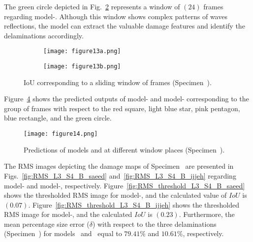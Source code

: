 The green circle depicted in Fig.~\ref{fig:L3_S4_B_333x333p_50kHz_5HC_shapes_} represents a window of \((24)\) frames regarding model-.
Although this window shows complex patterns of waves reflections, the model can extract the valuable damage features and identify the delaminations accordingly.
\begin{figure} [!h]
	\centering
	\begin{subfigure}[b]{1\textwidth}
		\centering
		\texttt{[image: figure13a.png]}
		\caption{}
		\label{fig:L3_S4_B_333x333p_50kHz_5HC_IoU}
	\end{subfigure}
	\par\medskip
	\begin{subfigure}[b]{1\textwidth}
		\centering
		\texttt{[image: figure13b.png]}
		\caption{} 
		\label{fig:L3_S4_B_333x333p_50kHz_5HC_shapes_}
	\end{subfigure}
	\caption{IoU corresponding to a sliding window of frames (Specimen~).}
	\label{fig:L3_S4_B_333x333p_50kHz_5HC_IoU_centre_window}
\end{figure} 

Figure~\ref{fig:L3_S4_B_5HC_predictions} shows the predicted outputs of model- and model- corresponding to the group of frames with respect to the red square, light blue star, pink pentagon, blue rectangle, and the green circle. 
\begin{figure}[!h]
	\centering
	\texttt{[image: figure14.png]}
	\caption{Predictions of models  and  at different window places (Specimen~).}
	\label{fig:L3_S4_B_5HC_predictions}
\end{figure}

The RMS images depicting the damage maps of Specimen~ are presented in Figs.~\ref{fig:RMS_L3_S4_B_saeed} and~\ref{fig:RMS_L3_S4_B_ijjeh} regarding model- and model-, respectively.
Figure~\ref{fig:RMS_threshold_L3_S4_B_saeed} shows the thresholded RMS image for model-, and the calculated value of \(IoU\) is \((0.07)\).
Figure~\ref{fig:RMS_threshold_L3_S4_B_ijjeh}  shows the thresholded RMS image for model-, and the calculated \(IoU\) is \((0.23)\).
Furthermore, the mean percentage size error (\(\delta\)) with respect to the three delaminations (Specimen~) for models~ and~ equal to \(79.41\%\) and \(10.61\%\), respectively.


